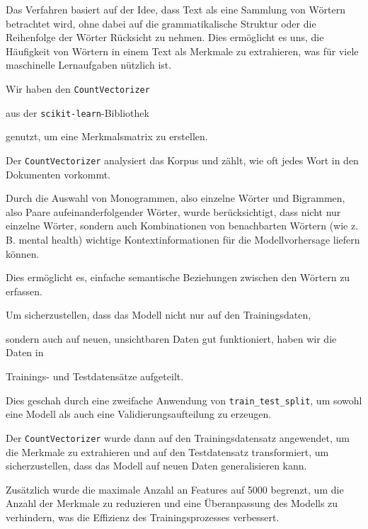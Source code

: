 Das Verfahren basiert auf der Idee, dass Text als eine Sammlung von Wörtern betrachtet wird, ohne dabei auf die grammatikalische Struktur oder die Reihenfolge der Wörter Rücksicht zu nehmen. Dies ermöglicht es uns, die Häufigkeit von Wörtern in einem Text als Merkmale zu extrahieren, was für viele maschinelle Lernaufgaben nützlich ist.

Wir haben den \texttt{CountVectorizer} 

aus der \texttt{scikit-learn}-Bibliothek 

genutzt, um eine Merkmalsmatrix zu erstellen. 

Der \texttt{CountVectorizer} analysiert das Korpus und zählt, wie oft jedes Wort in den Dokumenten vorkommt. 

Durch die Auswahl von Monogrammen, also einzelne Wörter und Bigrammen, also Paare aufeinanderfolgender Wörter, wurde berücksichtigt, dass nicht nur einzelne Wörter, sondern auch Kombinationen von benachbarten Wörtern (wie z.\,B. mental health) wichtige Kontextinformationen für die Modellvorhersage liefern können.

Dies ermöglicht es, einfache semantische Beziehungen zwischen den Wörtern zu erfassen.

Um sicherzustellen, dass das Modell nicht nur auf den Trainingsdaten, 

sondern auch auf neuen, unsichtbaren Daten gut funktioniert, haben wir die Daten in

Trainings- und Testdatensätze aufgeteilt.

Dies geschah durch eine zweifache Anwendung von \verb|train_test_split|, um sowohl eine Modell als auch eine Validierungsaufteilung zu erzeugen. 

Der \verb|CountVectorizer| wurde dann auf den Trainingsdatensatz angewendet, um die Merkmale zu extrahieren und auf den Testdatensatz transformiert, um sicherzustellen, dass das Modell auf neuen Daten generalisieren kann.

Zusätzlich wurde die maximale Anzahl an Features auf 5000 begrenzt, um die Anzahl der Merkmale zu reduzieren und eine Überanpassung des Modells zu verhindern, was die Effizienz des Trainingsprozesses verbessert.